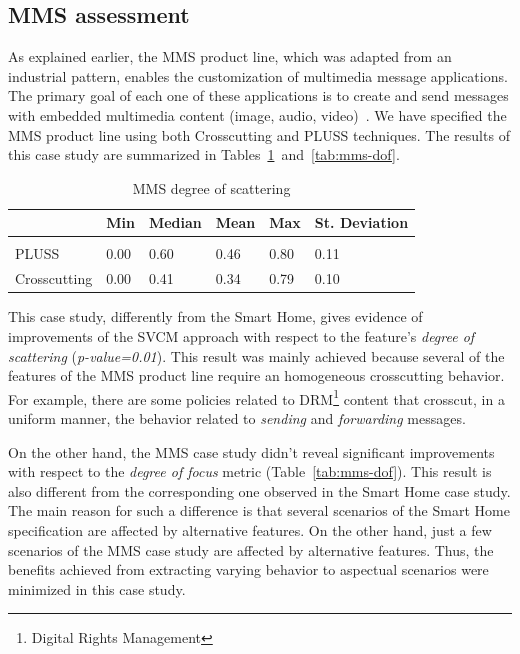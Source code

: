 \documentclass{acm_proc_article-sp}
\begin{document}

\subsection{MMS assessment}

As explained earlier, the MMS product line, which was adapted from an industrial
pattern, enables the customization of multimedia message applications. The
primary goal of each one of these applications is to create and send messages
with embedded multimedia content (image, audio, video)~\cite{Bonifacio:2008aa}.
We have specified the MMS product line using both Crosscutting and PLUSS
techniques. The results of this case study are
summarized in Tables~\ref{tab:mms-dos}~and~\ref{tab:mms-dof}.

\begin{table}[htb] \centering
\caption{MMS degree of scattering}
\label{tab:mms-dos}
\begin{small}
\begin{tabular}{llllll} \hline
					& Min 	& Median 	& Mean 	& Max 	& St. Deviation \\ \hline \\
	PLUSS			& 0.00  & 0.60   	& 0.46  & 0.80 	& 0.11 			\\
	Crosscutting	& 0.00  & 0.41   	& 0.34 	& 0.79 	& 0.10			\\ \hline	
\end{tabular}
\end{small}
\end{table}

This case study, differently from the Smart Home, gives evidence of improvements of the
SVCM approach with respect to the feature's \emph{degree of scattering}
(\emph{p-value=0.01}). This result was mainly achieved because several of the features of
the MMS product line require an homogeneous crosscutting behavior. For example,
there are some policies related to DRM\footnote{Digital Rights Management}
content that crosscut, in a uniform manner, the behavior related to
\emph{sending} and \emph{forwarding} messages.

On the other hand, the MMS case study didn't reveal significant improvements with
respect to the \emph{degree of focus} metric (Table~\ref{tab:mms-dof}). This
result is also different from the corresponding one observed in the Smart Home
case study. The main reason for such a difference is that several scenarios of
the Smart Home specification are affected by alternative features. On the other
hand, just a few scenarios of the MMS case study are affected by alternative
features. Thus, the benefits achieved from extracting varying behavior to
aspectual scenarios were minimized in this case study.
\end{document}
